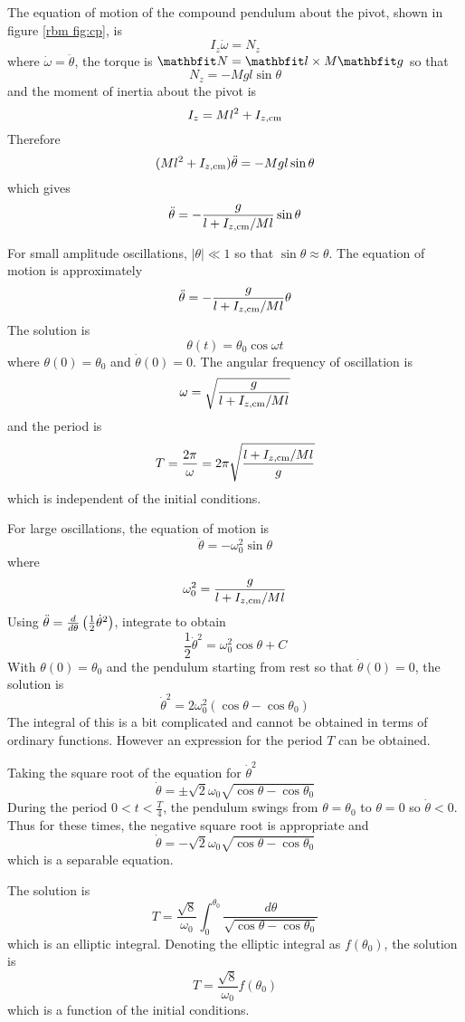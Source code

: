 \begin{example}
The equation of motion of the compound pendulum about the pivot, 
shown in figure \ref{rbm fig:cp}, is
$$I_z\dot{\omega}=N_z$$
where $\dot{\omega}=\ddot{\theta}$, the torque is $\vect{N}=\vect{l}\times
M\vect{g}$ so that
$$N_z=-Mgl\sin\theta$$
and the moment of inertia about the pivot is
$$I_z=Ml^2+I_{z,\rm cm}$$
Therefore
$$(Ml^2+I_{z,\rm cm})\ddot{\theta}=-Mgl\sin\theta$$
which gives
$$\ddot{\theta}=-\frac{g}{l+I_{z,\rm cm}/Ml}\sin\theta$$

For small amplitude oscillations, $\left|\theta\right|\ll 1$ so that
$\sin\theta\approx\theta$.  The equation of motion is approximately
$$\ddot{\theta}=-\frac{g}{l+I_{z,\rm cm}/Ml}\theta$$
The solution is
$$\theta(t)=\theta_0\cos\omega t$$
where $\theta(0)=\theta_0$ and $\dot{\theta}(0)=0$.  The angular frequency
of oscillation is
$$\omega=\sqrt{\frac{g}{l+I_{z,\rm cm}/Ml}}$$
and the period is
$$T=\frac{2\pi}{\omega}=2\pi\sqrt{\frac{l+I_{z,\rm cm}/Ml}{g}}$$
which is independent of the initial conditions.

For large oscillations, the equation of motion is
$$\ddot{\theta}=-\omega_0^2\sin\theta$$
where
$$\omega_0^2=\frac{g}{l+I_{z,\rm cm}/Ml}$$
Using $\ddot{\theta}=\frac{d}{d{\theta}}\left(\frac{1}{2}\dot{\theta}^2\right)$,
integrate to obtain
$$\frac{1}{2}\dot{\theta}^2=\omega_0^2\cos\theta+C$$
With $\theta(0)=\theta_0$ and the pendulum starting from rest so that
$\dot{\theta}(0)=0$, the solution is
$$\dot{\theta}^2=2\omega_0^2(\cos\theta-\cos\theta_0)$$
The integral of this is a bit complicated and cannot be obtained in terms of 
ordinary functions.  However an expression for the period $T$ can be
obtained.

Taking the square root of the equation for $\dot{\theta}^2$ 
$$\dot{\theta}=\pm\sqrt{2}\omega_0\sqrt{\cos\theta-\cos\theta_0}$$
During the period $0<t<\frac{T}{4}$, the pendulum swings from
$\theta=\theta_0$ to $\theta=0$ so $\dot{\theta}<0$.  Thus for these times,
the negative square root is appropriate and
$$\dot{\theta}=-\sqrt{2}\omega_0\sqrt{\cos\theta-\cos\theta_0}$$
which is a separable equation.

The solution is
$$T=\frac{\sqrt{8}}{\omega_0}\int^{\theta_0}_0\frac{d\theta}{\sqrt{\cos\theta
-\cos\theta_0}}$$
which is an elliptic integral.  Denoting the elliptic integral as
$f(\theta_0)$, the solution is
$$T=\frac{\sqrt{8}}{\omega_0}f(\theta_0)$$
which is a function of the initial conditions.
\end{example}

